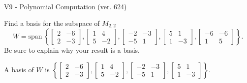 \begin{exercise}
  \begin{exerciseTitle}V9 - Polynomial Computation (ver. 624)\end{exerciseTitle}
  \begin{exerciseStatement}
    Find a basis for the subspace of \(M_{2,2}\) 
\[W=\mathrm{span}\ \left\{\left[\begin{array}{cc}
2 & -6 \\
2 & -3
\end{array}\right] , \left[\begin{array}{cc}
1 & 4 \\
5 & -2
\end{array}\right] , \left[\begin{array}{cc}
-2 & -3 \\
-5 & 1
\end{array}\right] , \left[\begin{array}{cc}
5 & 1 \\
1 & -3
\end{array}\right] , \left[\begin{array}{cc}
-6 & -6 \\
1 & 5
\end{array}\right]\right\}.\]
 Be sure to explain why your result is a basis.


  \end{exerciseStatement}
  \begin{exerciseAnswer}
   A basis of \(W\) is  \(\left\{\left[\begin{array}{cc}
2 & -6 \\
2 & -3
\end{array}\right] , \left[\begin{array}{cc}
1 & 4 \\
5 & -2
\end{array}\right] , \left[\begin{array}{cc}
-2 & -3 \\
-5 & 1
\end{array}\right] , \left[\begin{array}{cc}
5 & 1 \\
1 & -3
\end{array}\right]\right\}\).
  


  \end{exerciseAnswer}
\end{exercise}